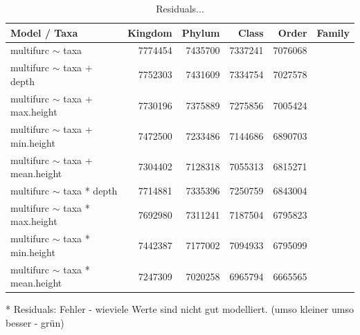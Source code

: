         \begin{table}[h]
          \begin{center}
              \begin{tabular}{ |l|r|r|r|r|r| }
                \hline
                Model / Taxa & Kingdom & Phylum & Class & Order & Family \\
                \hline \hline
                multifurc $\sim$ taxa & 7774454 & \cellcolor{green!10}7435700 & \cellcolor{green!15}7337241 & \cellcolor{green!30}7076068 \\
                \hline
                multifurc $\sim$ taxa + depth & 7752303 & \cellcolor{green!10}7431609 & \cellcolor{green!15}7334754 & \cellcolor{green!30}7027578 \\
                multifurc $\sim$ taxa + max.height & 7730196 & \cellcolor{green!15}7375889 & \cellcolor{green!20}7275856 & \cellcolor{green!30}7005424 \\
                multifurc $\sim$ taxa + min.height & \cellcolor{green!10}7472500 & \cellcolor{green!20}7233486 & \cellcolor{green!25}7144686 & \cellcolor{green!40}6890703 \\
                multifurc $\sim$ taxa + mean.height & \cellcolor{green!15}7304402 & \cellcolor{green!25}7128318 & \cellcolor{green!30}7055313 & \cellcolor{green!40}6815271 \\
                \hline
                multifurc $\sim$ taxa * depth & 7714881 & \cellcolor{green!15}7335396 & \cellcolor{green!20}7250759 & \cellcolor{green!40}6843004 \\
                multifurc $\sim$ taxa * max.height & \cellcolor{green!5}7692980 & \cellcolor{green!15}7311241 & \cellcolor{green!25}7187504 & \cellcolor{green!45}6795823 \\
                multifurc $\sim$ taxa * min.height & \cellcolor{green!10}7442387 & \cellcolor{green!25}7177002 & \cellcolor{green!30}7094933 & \cellcolor{green!45}6795099 \\
                multifurc $\sim$ taxa * mean.height & \cellcolor{green!20}7247309 & \cellcolor{green!30}7020258 & \cellcolor{green!35}6965794 & \cellcolor{green!50}6665565 \\
                \hline
              \end{tabular}
          \end{center}
          \caption{Residuals...}
          \label{table:...} 
        \end{table}
        * Residuals: Fehler - wieviele Werte sind nicht gut modelliert. (umso kleiner umso besser - grün) \\

